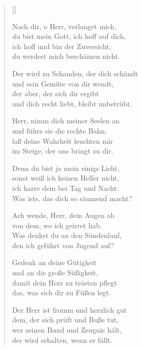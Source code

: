 \begin{multicols}{2}
\settowidth{\versewidth}{Der wird zu Schanden, der dich schändt}
\begin{verse}[\versewidth]

 Nach dir, o Herr, verlanget mich,\\
du bist mein Gott, ich hoff auf dich,\\
ich hoff und bin der Zuversicht,\\
du werdest mich beschämen nicht.

 Der wird zu Schanden, der dich schändt\\
und sein Gemüte von dir wendt,\\
der aber, der sich dir ergibt\\
und dich recht liebt, bleibt unbetrübt.

 Herr, nimm dich meiner Seelen an\\
und führe sie die rechte Bahn,\\
laß deine Wahrheit leuchten mir\\
im Steige, der uns bringt zu dir.

 Denn du bist ja mein einigs Licht,\\
sonst weiß ich keinen Helfer nicht,\\
ich harre dein bei Tag und Nacht:\\
Was ists, das dich so säumend macht?

 Ach wende, Herr, dein Augen ab\\
von dem, wo ich geirret hab.\\
Was denkst du an den Sündenlauf,\\
den ich geführt von Jugend auf?

 Gedenk an deine Gütigkeit\\
und an die große Süßigkeit,\\
damit dein Herz zu trösten pflegt\\
das, was sich dir zu Füßen legt.

 Der Herr ist fromm und herzlich gut\\
dem, der sich prüft und Buße tut,\\
wer seinen Bund und Zeugnis hält,\\
der wird erhalten, wenn er fällt.


\end{verse}
\end{multicols}
